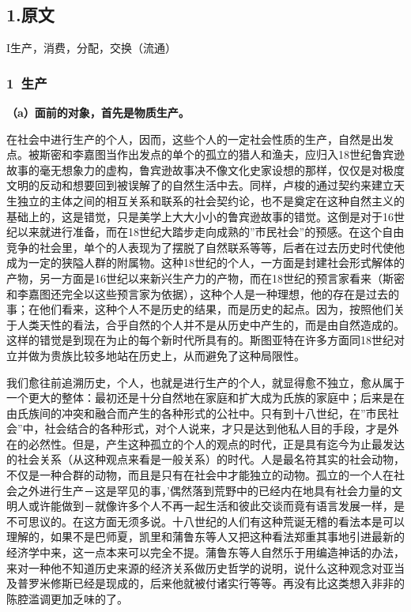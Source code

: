 \documentclass[a4paper,twoside,12pt]{ctexart}
\begin{document}
\subsection{1.原文}
\begin{center}
 I生产，消费，分配，交换（流通）    
\end{center}
\subsubsection{1~生产}
\textbf{（a）面前的对象，首先是物质生产。}

在社会中进行生产的个人，因而，这些个人的一定社会性质的生产，自然是出发点。被斯密和李嘉图当作出发点的单个的孤立的猎人和渔夫，应归入18世纪鲁宾逊故事的毫无想象力的虚构，鲁宾逊故事决不像文化史家设想的那样，仅仅是对极度文明的反动和想要回到被误解了的自然生活中去。同样，卢梭的通过契约来建立天生独立的主体之间的相互关系和联系的社会契约论，也不是奠定在这种自然主义的基础上的，这是错觉，只是美学上大大小小的鲁宾逊故事的错觉。这倒是对于16世纪以来就进行准备，而在18世纪大踏步走向成熟的”市民社会”的预感。在这个自由竞争的社会里，单个的人表现为了摆脱了自然联系等等，后者在过去历史时代使他成为一定的狭隘人群的附属物。这种18世纪的个人，一方面是封建社会形式解体的产物，另一方面是16世纪以来新兴生产力的产物，而在18世纪的预言家看来（斯密和李嘉图还完全以这些预言家为依据），这种个人是一种理想，他的存在是过去的事；在他们看来，这种个人不是历史的结果，而是历史的起点。因为，按照他们关于人类天性的看法，合乎自然的个人并不是从历史中产生的，而是由自然造成的。这样的错觉是到现在为止的每个新时代所具有的。斯图亚特在许多方面同18世纪对立并做为贵族比较多地站在历史上，从而避免了这种局限性。

我们愈往前追溯历史，个人，也就是进行生产的个人，就显得愈不独立，愈从属于一个更大的整体：最初还是十分自然地在家庭和扩大成为氏族的家庭中；后来是在由氏族间的冲突和融合而产生的各种形式的公社中。只有到十八世纪，在”市民社会”中，社会结合的各种形式，对个人说来，才只是达到他私人目的手段，才是外在的必然性。但是，产生这种孤立的个人的观点的时代，正是具有迄今为止最发达的社会关系（从这种观点来看是一般关系）的时代。人是最名符其实的社会动物，不仅是一种合群的动物，而且是只有在社会中才能独立的动物。孤立的一个人在社会之外进行生产－这是罕见的事，’偶然落到荒野中的已经内在地具有社会力量的文明人或许能做到－就像许多个人不再一起生活和彼此交谈而竟有语言发展一样，是不可思议的。在这方面无须多说。十八世纪的人们有这种荒诞无稽的看法本是可以理解的，如果不是巴师夏，凯里和蒲鲁东等人又把这种看法郑重其事地引进最新的经济学中来，这一点本来可以完全不提。蒲鲁东等人自然乐于用编造神话的办法，来对一种他不知道历史来源的经济关系做历史哲学的说明，说什么这种观念对亚当及普罗米修斯已经是现成的，后来他就被付诸实行等等。再没有比这类想入非非的陈腔滥调更加乏味的了。
\end{document}
